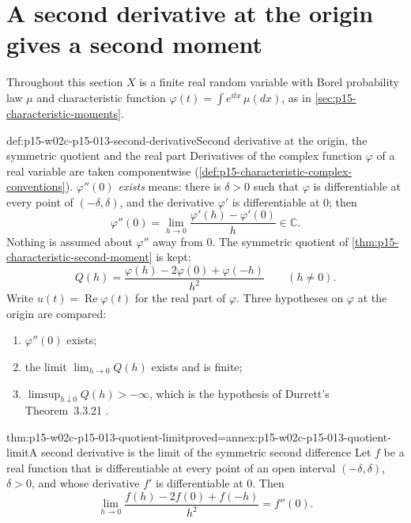 \section{A second derivative at the origin gives a second moment}
\label{sec:p15-w02c-p15-013-second-derivative}

Throughout this section \(X\) is a finite real random variable with Borel
probability law \(\mu\) and characteristic function
\(\varphi(t)=\int e^{itx}\,\mu(dx)\), as in
\cref{sec:p15-characteristic-moments}.

\begin{hbconvention}{def:p15-w02c-p15-013-second-derivative}{Second derivative at the origin, the symmetric quotient and the real part}
Derivatives of the complex function \(\varphi\) of a real variable are taken
componentwise (\cref{def:p15-characteristic-complex-conventions}).
\emph{\(\varphi''(0)\) exists} means: there is \(\delta>0\) such that
\(\varphi\) is differentiable at every point of \((-\delta,\delta)\), and the
derivative \(\varphi'\) is differentiable at \(0\); then
\[
 \varphi''(0)=\lim_{h\to0}\frac{\varphi'(h)-\varphi'(0)}{h}\in\mathbb C .
\]
Nothing is assumed about \(\varphi''\) away from \(0\).
The symmetric quotient of \cref{thm:p15-characteristic-second-moment} is kept:
\[
 Q(h)=\frac{\varphi(h)-2\varphi(0)+\varphi(-h)}{h^2}\qquad(h\neq0).
\]
Write \(u(t)=\operatorname{Re}\varphi(t)\) for the real part of \(\varphi\).
Three hypotheses on \(\varphi\) at the origin are compared:
\begin{enumerate}
\item[(D)] \(\varphi''(0)\) exists;
\item[(S)] the limit \(\lim_{h\to0}Q(h)\) exists and is finite;
\item[(U)] \(\limsup_{h\downarrow0}Q(h)>-\infty\), which is the hypothesis
      of Durrett's Theorem~3.3.21 \cite[p.~136]{DurrettPTEAuthor2019}.
\end{enumerate}
\end{hbconvention}

\begin{hblemma}{thm:p15-w02c-p15-013-quotient-limit}{proved=annex:p15-w02c-p15-013-quotient-limit}{A second derivative is the limit of the symmetric second difference}
Let \(f\) be a real function that is differentiable at every point of an
open interval \((-\delta,\delta)\), \(\delta>0\), and whose derivative \(f'\)
is differentiable at \(0\). Then
\[
 \lim_{h\to0}\frac{f(h)-2f(0)+f(-h)}{h^2}=f''(0).
\]
\end{hblemma}

